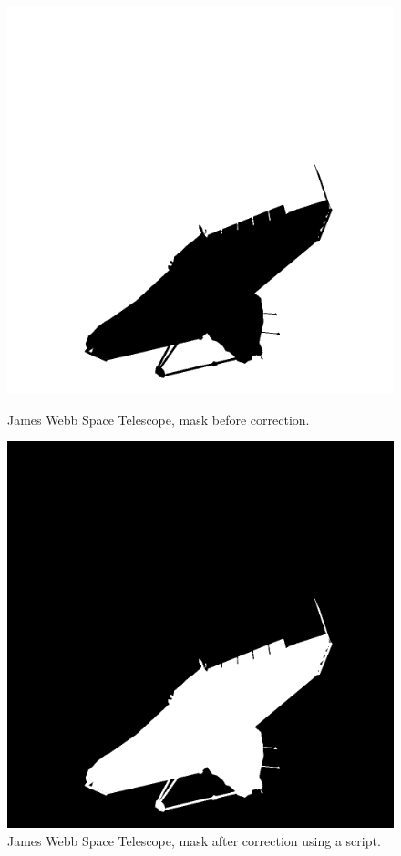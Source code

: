 \begin{figure}[h]
    \centering
    \begin{minipage}{0.45\linewidth}
        \centering
        \includegraphics[width=\linewidth]{data/mask1.png} %
        \caption{James Webb Space Telescope, mask before correction.}
        \label{fig:mask1}
    \end{minipage}\hfill
    \begin{minipage}{0.45\linewidth}
        \centering
        \includegraphics[width=\linewidth]{data/mask2.png} %
        \caption{James Webb Space Telescope, mask after correction using a script.}
        \label{fig:mask2}
    \end{minipage}
\end{figure}

